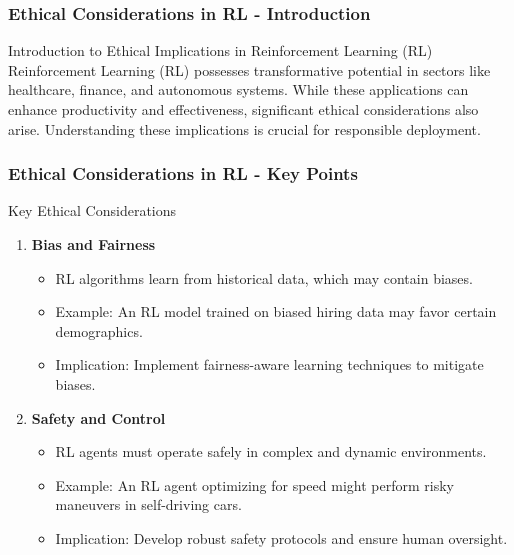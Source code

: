 \documentclass[aspectratio=169]{beamer}
\begin{document}
\begin{frame}[fragile]
    \frametitle{Ethical Considerations in RL - Introduction}
    \begin{block}{Introduction to Ethical Implications in Reinforcement Learning (RL)}
    Reinforcement Learning (RL) possesses transformative potential in sectors like healthcare, finance, and autonomous systems. 
    While these applications can enhance productivity and effectiveness, significant ethical considerations also arise. 
    Understanding these implications is crucial for responsible deployment.
    \end{block}
\end{frame}

\begin{frame}[fragile]
    \frametitle{Ethical Considerations in RL - Key Points}
    \begin{block}{Key Ethical Considerations}
        \begin{enumerate}
            \item \textbf{Bias and Fairness}
                \begin{itemize}
                    \item RL algorithms learn from historical data, which may contain biases.
                    \item Example: An RL model trained on biased hiring data may favor certain demographics.
                    \item Implication: Implement fairness-aware learning techniques to mitigate biases.
                \end{itemize}
          
            \item \textbf{Safety and Control}
                \begin{itemize}
                    \item RL agents must operate safely in complex and dynamic environments.
                    \item Example: An RL agent optimizing for speed might perform risky maneuvers in self-driving cars.
                    \item Implication: Develop robust safety protocols and ensure human oversight.
                \end{itemize}
        \end{enumerate}
    \end{block}
\end{frame}
\end{document}
